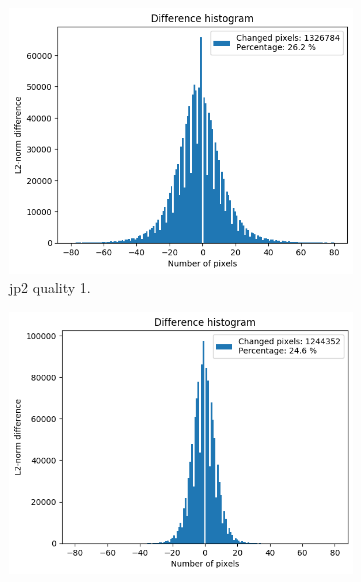 \begin{figure}[htb]
    \centering
        \begin{subfigure}[b]{0.49\textwidth}
            \centering
            \includegraphics[width=\textwidth]{doc/thesis/0_figures/compare_quality/set1/histograms/jp2_1_diff_histogram.png}
            \caption{\gls{jp2} quality 1.}
            \label{fig:img_quality_histogram_1}
        \end{subfigure}
        \begin{subfigure}[b]{0.49\textwidth}
            \centering
            \includegraphics[width=\textwidth]{doc/thesis/0_figures/compare_quality/set1/histograms/jp2_5_diff_histogram.png}

\end{subfigure}
\end{figure}
